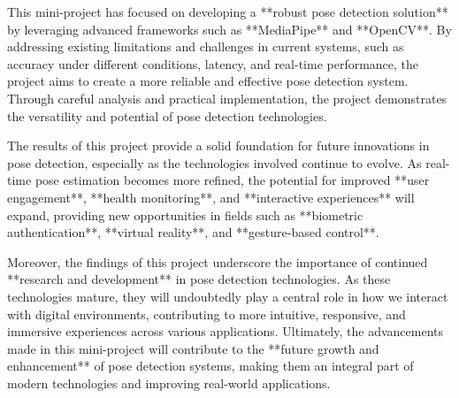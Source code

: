 \documentclass[a4paper,12pt]{report}
\begin{document}
This mini-project has focused on developing a **robust pose detection solution** by leveraging advanced frameworks such as **MediaPipe** and **OpenCV**. By addressing existing limitations and challenges in current systems, such as accuracy under different conditions, latency, and real-time performance, the project aims to create a more reliable and effective pose detection system. Through careful analysis and practical implementation, the project demonstrates the versatility and potential of pose detection technologies.

The results of this project provide a solid foundation for future innovations in pose detection, especially as the technologies involved continue to evolve. As real-time pose estimation becomes more refined, the potential for improved **user engagement**, **health monitoring**, and **interactive experiences** will expand, providing new opportunities in fields such as **biometric authentication**, **virtual reality**, and **gesture-based control**. 

Moreover, the findings of this project underscore the importance of continued **research and development** in pose detection technologies. As these technologies mature, they will undoubtedly play a central role in how we interact with digital environments, contributing to more intuitive, responsive, and immersive experiences across various applications. Ultimately, the advancements made in this mini-project will contribute to the **future growth and enhancement** of pose detection systems, making them an integral part of modern technologies and improving real-world applications.
\end{document}
